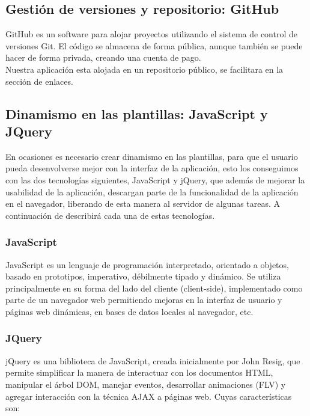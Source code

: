 \subsection{Gestión de versiones y repositorio: GitHub}

GitHub es un software para alojar proyectos utilizando el sistema de control de versiones Git. 
El código se almacena de forma pública, aunque también se puede hacer de forma privada, creando una cuenta de pago.\\

Nuestra aplicación esta alojada en un repositorio público, se facilitara en la sección de enlaces.

\subsection{Dinamismo en las plantillas: JavaScript y JQuery}

En ocasiones es necesario crear dinamismo en las plantillas, para que el usuario pueda desenvolverse mejor con la interfaz de la aplicación, esto los conseguimos con las dos
tecnologías siguientes, JavaScript y jQuery, que además de mejorar la usabilidad de la aplicación, descargan parte de la funcionalidad de la aplicación en el navegador, 
liberando de esta manera al servidor de algunas tareas. A continuación de describirá cada una de estas tecnologías.\\

\subsubsection{JavaScript}
JavaScript es un lenguaje de programación interpretado, orientado a objetos, basado en prototipos, imperativo, débilmente tipado y dinámico. 
Se utiliza principalmente en su forma del lado del cliente (client-side), implementado como parte de un navegador web permitiendo mejoras en 
la interfaz de usuario y páginas web dinámicas, en bases de datos locales al navegador, etc.

\subsubsection{JQuery}
jQuery es una biblioteca de JavaScript, creada inicialmente por John Resig, que permite simplificar la manera de interactuar con los documentos HTML,
manipular el árbol DOM, manejar eventos, desarrollar animaciones (FLV) y agregar interacción con la técnica AJAX a páginas web. Cuyas características son:


